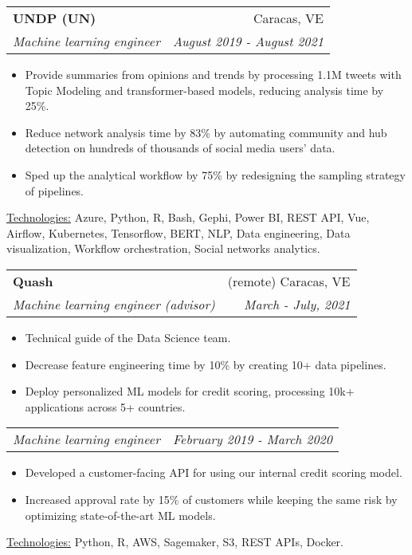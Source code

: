 \documentclass[letterpaper,11pt]{article}
\makeatletter
\newcommand{\sepsection}{\vspace{25pt}}
\newcommand{\resumeItem}[1]{%
  \item\small{
    #1
  }
}
\newcommand{\resumeSubheading}[4]{
  \vspace{8pt}\item%
    \begin{tabular*}{0.97\textwidth}[t]{l@{\extracolsep{\fill}}r}
      \textbf{#1} & #2 \\
      \textit{\small#3} & \textit{\small #4} \\
    \end{tabular*}\vspace{-5pt}
}
\newcommand{\resumeSubSubheading}[2]{
    \vspace{1pt}
    \begin{tabular*}{0.97\textwidth}{l@{\extracolsep{\fill}}r}
      \textit{\small#1} & \textit{\small #2} \\
    \end{tabular*}\vspace{-5pt}
}
\newcommand{\resumeItemListStart}{\begin{itemize}}
\newcommand{\resumeItemListEnd}{\end{itemize}\vspace{-5pt}}
\newcommand{\resumeTech}[2]{
 \underline{#1:} #2
}
\makeatother
\begin{document}
    \resumeSubheading
      {UNDP (UN)}{Caracas, VE}
      {Machine learning engineer}{August 2019 - August 2021}
      \resumeItemListStart
      \resumeItem{Provide summaries from opinions and trends by processing 1.1M tweets with Topic Modeling and transformer-based models, reducing analysis time by 25\%.}
      \resumeItem{Reduce network analysis time by 83\%  by automating community and hub detection on hundreds of thousands of social media users' data.}
      \resumeItem{Sped up the analytical workflow by 75\% by redesigning the sampling strategy of pipelines.}
      \resumeItemListEnd
      \resumeTech{Technologies}{Azure, Python, R, Bash, Gephi, Power BI, REST API, Vue, Airflow, Kubernetes, Tensorflow, BERT, NLP, Data engineering, Data visualization, Workflow orchestration, Social networks analytics.}\\

    \sepsection

    \resumeSubheading
      {Quash}{(remote) Caracas, VE}
      {Machine learning engineer (advisor)}{March - July, 2021}
      \resumeItemListStart
      \resumeItem{Technical guide of the Data Science team.}
      \resumeItem{Decrease feature engineering time by 10\% by creating 10+ data pipelines.}
      \resumeItem{Deploy personalized ML models for credit scoring, processing 10k+ applications across 5+ countries.}
      \resumeItemListEnd
      \resumeSubSubheading
      {Machine learning engineer}{February 2019 - March 2020}
     \resumeItemListStart
      \resumeItem{Developed a customer-facing API for using our internal credit scoring model.}
      \resumeItem{Increased approval rate by 15\% of customers while keeping the same risk by optimizing state-of-the-art ML models.}
      \resumeItemListEnd
      \resumeTech{Technologies}{Python, R, AWS, Sagemaker, S3, REST APIs, Docker.}\\
      
    \sepsection
\end{document}
